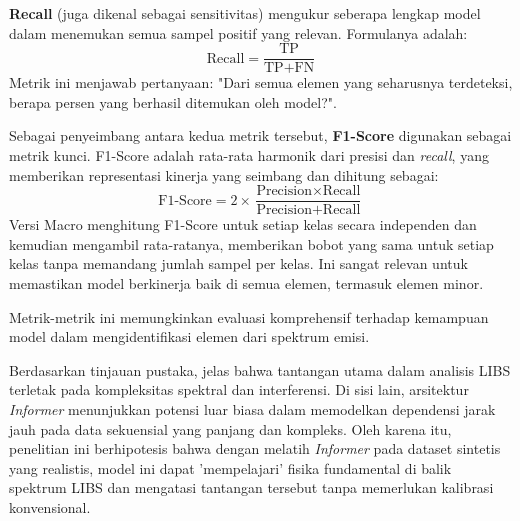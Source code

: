 \textbf{Recall} (juga dikenal sebagai sensitivitas) mengukur seberapa lengkap model dalam menemukan semua sampel positif yang relevan. Formulanya adalah:
\begin{equation}
\text{Recall} = \frac{\text{TP}}{\text{TP} + \text{FN}}
\end{equation}
Metrik ini menjawab pertanyaan: "Dari semua elemen yang seharusnya terdeteksi, berapa persen yang berhasil ditemukan oleh model?".

Sebagai penyeimbang antara kedua metrik tersebut, \textbf{F1-Score} digunakan sebagai metrik kunci. F1-Score adalah rata-rata harmonik dari presisi dan \textit{recall}, yang memberikan representasi kinerja yang seimbang dan dihitung sebagai:
\begin{equation}
\text{F1-Score} = 2 \times \frac{\text{Precision} \times \text{Recall}}{\text{Precision} + \text{Recall}}
\end{equation}
Versi Macro menghitung F1-Score untuk setiap kelas secara independen dan kemudian mengambil rata-ratanya, memberikan bobot yang sama untuk setiap kelas tanpa memandang jumlah sampel per kelas. Ini sangat relevan untuk memastikan model berkinerja baik di semua elemen, termasuk elemen minor.

Metrik-metrik ini memungkinkan evaluasi komprehensif terhadap kemampuan model dalam mengidentifikasi elemen dari spektrum emisi.


Berdasarkan tinjauan pustaka, jelas bahwa tantangan utama dalam analisis LIBS terletak pada kompleksitas spektral dan interferensi. Di sisi lain, arsitektur \textit{Informer} menunjukkan potensi luar biasa dalam memodelkan dependensi jarak jauh pada data sekuensial yang panjang dan kompleks. Oleh karena itu, penelitian ini berhipotesis bahwa dengan melatih \textit{Informer} pada dataset sintetis yang realistis, model ini dapat 'mempelajari' fisika fundamental di balik spektrum LIBS dan mengatasi tantangan tersebut tanpa memerlukan kalibrasi konvensional.